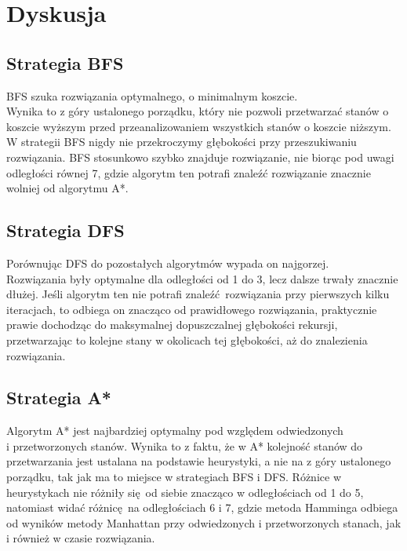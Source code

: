 \documentclass{classrep}
\begin{document}
\section{Dyskusja}
{
	\subsection{Strategia BFS}
	BFS szuka rozwiązania optymalnego, o minimalnym koszcie. \\
	Wynika to z góry ustalonego porządku, który nie pozwoli przetwarzać stanów o koszcie wyższym przed 
	przeanalizowaniem wszystkich stanów o koszcie niższym. W strategii BFS 	nigdy nie przekroczymy głębokości przy 
	przeszukiwaniu rozwiązania. BFS stosunkowo szybko znajduje rozwiązanie,
	nie biorąc pod uwagi odległości równej 7, gdzie algorytm ten potrafi znaleźć rozwiązanie znacznie wolniej od
	algorytmu A*.
	\subsection{Strategia DFS}
	Porównując DFS do pozostałych algorytmów wypada on najgorzej. \\
	Rozwiązania były optymalne dla odległości od 1 do 3, lecz dalsze trwały znacznie dłużej. Jeśli algorytm ten nie 
	potrafi znaleźć rozwiązania przy pierwszych kilku iteracjach, to odbiega on znacząco od prawidłowego rozwiązania, 
	praktycznie prawie dochodząc do maksymalnej dopuszczalnej głębokości rekursji, przetwarzając to kolejne stany w 
	okolicach tej głębokości, aż do znalezienia rozwiązania.
	\newpage
	\subsection{Strategia A*}
	Algorytm A* jest najbardziej optymalny pod względem odwiedzonych\\
	i przetworzonych stanów. Wynika to z faktu, że w 
	A* kolejność stanów do przetwarzania jest ustalana na podstawie heurystyki, a nie na z góry ustalonego porządku,
	tak jak ma to miejsce w strategiach BFS i DFS. Różnice w heurystykach nie różniły się od siebie znacząco w 
	odległościach od 1 do 5, natomiast widać różnicę na odległościach 6 i 7, gdzie metoda Hamminga odbiega od wyników 
	metody Manhattan przy odwiedzonych i przetworzonych stanach, jak i również w czasie rozwiązania.
}
\end{document}

